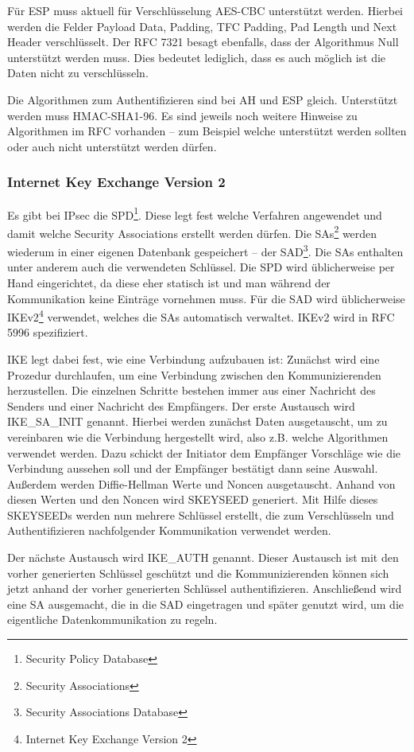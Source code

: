 \documentclass[12pt]{scrartcl}
\begin{document}
Für ESP muss aktuell für Verschlüsselung AES-CBC unterstützt werden. Hierbei werden die Felder Payload Data, Padding, TFC Padding, Pad Length und Next Header verschlüsselt. Der RFC 7321 besagt ebenfalls, dass der Algorithmus Null unterstützt werden muss. Dies bedeutet lediglich, dass es auch möglich ist die Daten nicht zu verschlüsseln.

Die Algorithmen zum Authentifizieren sind bei AH und ESP gleich. Unterstützt werden muss HMAC-SHA1-96. Es sind jeweils noch weitere Hinweise zu Algorithmen im RFC vorhanden -- zum Beispiel welche unterstützt werden sollten oder auch nicht unterstützt werden dürfen.

\subsubsection{Internet Key Exchange Version 2}
Es gibt bei IPsec die SPD\footnote{Security Policy Database}. Diese legt fest welche Verfahren angewendet und damit welche Security Associations erstellt werden dürfen. Die SAs\footnote{Security Associations} werden wiederum in einer eigenen Datenbank gespeichert -- der SAD\footnote{Security Associations Database}. Die SAs enthalten unter anderem auch die verwendeten Schlüssel. Die SPD wird üblicherweise per Hand eingerichtet, da diese eher statisch ist und man während der Kommunikation keine Einträge vornehmen muss. Für die SAD wird üblicherweise IKEv2\footnote{Internet Key Exchange Version 2} verwendet, welches die SAs automatisch verwaltet. IKEv2 wird in RFC 5996 spezifiziert.\cite{RFC5996}

IKE legt dabei fest, wie eine Verbindung aufzubauen ist: Zunächst wird eine Prozedur durchlaufen, um eine Verbindung zwischen den Kommunizierenden herzustellen. Die einzelnen Schritte bestehen immer aus einer Nachricht des Senders und einer Nachricht des Empfängers. Der erste Austausch wird IKE\_SA\_INIT genannt. Hierbei werden zunächst Daten ausgetauscht, um zu vereinbaren wie die Verbindung hergestellt wird, also z.B. welche Algorithmen verwendet werden. Dazu schickt der Initiator dem Empfänger Vorschläge wie die Verbindung aussehen soll und der Empfänger bestätigt dann seine Auswahl. Außerdem werden Diffie-Hellman Werte und Noncen ausgetauscht. Anhand von diesen Werten und den Noncen wird SKEYSEED generiert. Mit Hilfe dieses SKEYSEEDs werden nun mehrere Schlüssel erstellt, die zum Verschlüsseln und Authentifizieren nachfolgender Kommunikation verwendet werden. 

Der nächste Austausch wird IKE\_AUTH genannt. Dieser Austausch ist mit den vorher generierten Schlüssel geschützt und die Kommunizierenden können sich jetzt anhand der vorher generierten Schlüssel authentifizieren. Anschließend wird eine SA ausgemacht, die in die SAD eingetragen und später genutzt wird, um die eigentliche Datenkommunikation zu regeln.
\end{document}
